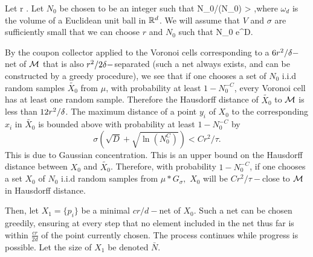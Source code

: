 \documentclass[final, 12pt]{colt2018} %
\begin{document}
Let \beq r \in {}.\eeq
Let $N_0$ be chosen to be an integer such that \beq N_0/\ln(N_0) > ,\eeq where $\omega_d$ is the volume of a Euclidean unit ball in $\mathbb R^d$.  We will assume that $V$ and $\sigma$ are sufficiently small that  we can choose $r$ and $N_0$ such that \beq N_0 \leq e^D.\eeq   

 By the coupon collector applied to the \hbox{Vor}onoi cells corresponding to a  $6r^2/{\mathbf{\delta}}-$net of $\mathcal M$ that is also $r^2/{2{\mathbf{\delta}}}-$separated (such a net always exists, and can be constructed by a greedy procedure), we see that if one chooses a set of $N_0$ i.i.d random samples $\tilde{X_0}$ from $\mu$, with probability at least $1 - N_0^{-C}$, every  \hbox{Vor}onoi cell has at least one random sample. Therefore the Hausdorff distance of $\tilde{X_0}$ to $\mathcal M$ is less than $12r^2/{\mathbf{\delta}}$. The maximum distance of a point $y_i$ of $X_0$ to the corresponding $x_i$ in $\tilde{X_0}$ is bounded above with probability  at least $1 - N_0^{-C}$ by $$\sigma(\sqrt{D} + \sqrt{\ln(N_0^C)}) < C r^2/\tau.$$ This is due to Gaussian concentration. This is an upper bound on the Hausdorff distance between $X_0$ and $\tilde{X_0}$.
Therefore, with probability $1 - N_0^{-C}$, if one chooses a set $X_0$ of $N_0$ i.i.d random samples from $\mu*G_\sigma,$ $X_0$ will be $C r^2/\tau-$close to $\mathcal M$ in Hausdorff distance. 

Then, let $X_1 = \{p_i\}$ be a minimal $cr/d-$net of $X_0$.  Such a net can be chosen greedily, ensuring at every step that no element included in the net thus far is within $\frac{cr}{2d}$ of the point currently chosen. The process continues while progress is possible. Let the size of $X_1$ be denoted $\bar{N}$.
\end{document}
